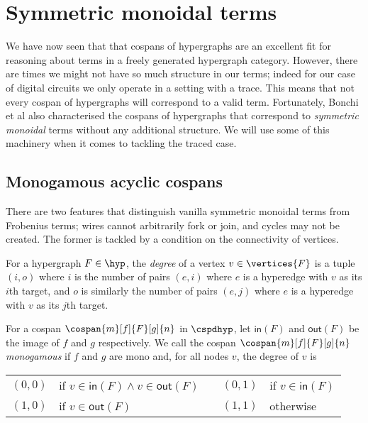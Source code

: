 \section{Symmetric monoidal terms}

We have now seen that that cospans of hypergraphs are an excellent fit for
reasoning about terms in a freely generated hypergraph category.
However, there are times we might not have so much structure in our terms;
indeed for our case of digital circuits we only operate in a setting with a
trace.
This means that not every cospan of hypergraphs will correspond to a valid term.
Fortunately, Bonchi et al also characterised the cospans of hypergraphs that
correspond to \emph{symmetric monoidal} terms without any additional structure.
We will use some of this machinery when it comes to tackling the traced case.

\subsection{Monogamous acyclic cospans}

There are two features that distinguish vanilla symmetric monoidal terms from
Frobenius terms; wires cannot arbitrarily fork or join, and cycles may not be
created.
The former is tackled by a condition on the connectivity of vertices.

\begin{definition}
    For a hypergraph \(F \in \hyp\), the \emph{degree} of a vertex
    \(v \in \vertices{F}\) is a tuple \((i,o)\) where \(i\) is the number of
    pairs \((e,i)\) where \(e\) is a hyperedge with \(v\) as its \(i\)th target,
    and \(o\) is similarly the number of pairs \((e,j)\) where \(e\) is a
    hyperedge with \(v\) as its \(j\)th target.
\end{definition}

\begin{definition}
    For a cospan \(\cospan{m}[f]{F}[g]{n}\) in
    \(\cspdhyp\), let \(\mathsf{in}(F)\) and \(\mathsf{out}(F)\) be the image of
    \(f\) and \(g\) respectively.
    We call the cospan \(\cospan{m}[f]{F}[g]{n}\) \emph{monogamous} if \(f\) and
    \(g\) are mono and, for all nodes \(v\), the degree of \(v\) is
    \begin{center}
        \begin{tabular}{rlcrl}
            \((0,0)\)
             &
            if \(v \in \mathsf{in}(F) \wedge v \in \mathsf{out}(F)\)
             &
            \quad
             &
            \((0,1)\)
             &
            if \(v \in \mathsf{in}(F)\)
            \\
            \((1,0)\)
             &
            if \(v \in \mathsf{out}(F)\)
             &
            \quad
             &
            \((1,1)\)
             &
            otherwise
        \end{tabular}
    \end{center}
\end{definition}


